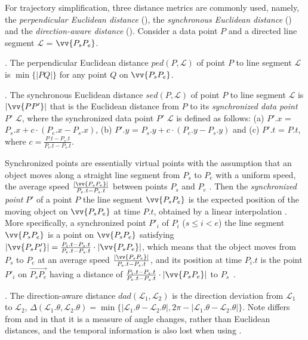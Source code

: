  For trajectory simplification, three distance metrics are commonly used, namely, the \emph{perpendicular Euclidean distance} (\ped), the \emph{synchronous Euclidean distance} \cite{Meratnia:Spatiotemporal} (\sed) and the \emph{direction-aware distance}\cite{Long:Direction, Zhang:Evaluation} (\dad).
%
Consider a data point $P$ and a directed line segment $\mathcal{L}$ = $\vv{P_{s}P_{e}}$.

. The perpendicular Euclidean distance $ped\left(P, \mathcal{L}\right)$ of point $P$ to line segment $\mathcal{L}$ is $\min\{|PQ|\}$ for any point $Q$ on $\vv{P_{s}P_{e}}$.

. The synchronous Euclidean distance $sed\left(P, \mathcal{L}\right)$ of point $P$ to line segment $\mathcal{L}$ is $|\vv{PP'}|$ that is the Euclidean distance from $P$ to its \textit{synchronized data point} $P'$ \wrt $\mathcal{L}$, where the synchronized data point $P'$ \wrt $\mathcal{L}$ is defined as follows:
(a) $P'.x$ = $P_s.x +  c\cdot\left(P_e.x - P_s.x\right)$,
(b) $P'.y$ = $P_s.y +  c\cdot\left(P_e.y - P_s.y\right)$ and
(c) $P'.t$ = $P.t$, where $c= \frac{P.t-P_s.t}{P_e.t-P_s.t}$.

{Synchronized points are essentially virtual points with the assumption that an object moves along a straight line segment from $P_s$ to $P_e$ with a uniform speed, \ie the average speed $\frac{|\vv{P_sP_e}|}{P_e.t-P_s.t}$ between points $P_s$ and $P_e$ \cite{Cao:Spatio,Lin:Cised}. Then the \emph{synchronized point} $P'$ of a point $P$ \wrt the line segment $\vv{P_sP_e}$ is the expected position of the moving object on $\vv{P_sP_e}$ at time $P.t$, obtained by a linear interpolation \cite{Cao:Spatio}. More specifically, a synchronized point $P'_i$ of $P_i$ ($s\le i < e$) \wrt the line segment $\vv{P_sP_e}$ is a point on $\vv{P_sP_{e}}$ satisfying ${|\vv{P_sP'_i}|} = \frac{P_i.t - P_s.t}{P_e.t - P_s.t}\cdot {|\vv{P_sP_e}|}$, which means that the object moves from $P_s$ to $P_e$ at an average speed $\frac{|\vv{P_sP_e}|}{P_e.t-P_s.t}$, and its position at time $P_i.t$ is the point $P'_i$ on $\overrightarrow{P_sP_{e}}$ having a distance of $\frac{P_i.t - P_s.t}{P_e.t - P_s.t}\cdot|\vv{P_sP_e}|$ to $P_s$~\cite{Cao:Spatio, Lin:Cised,Meratnia:Spatiotemporal, Chen:Fast, Zhang:Evaluation}.}

. The direction-aware distance $dad\left(\mathcal{L}_1, \mathcal{L}_2\right)$ is the direction deviation from $\mathcal{L}_1$ to $\mathcal{L}_2$, \ie $\Delta\left(\mathcal{L}_1.\theta, \mathcal{L}_2.\theta\right) = \min\{|\mathcal{L}_1.\theta - \mathcal{L}_2.\theta|, 2\pi - |\mathcal{L}_1.\theta - \mathcal{L}_2.\theta|\}$.
{Note \dad differs from \ped and \sed in that it is a measure of angle changes, rather than Euclidean distances, and the temporal information is also lost when using \dad.}





